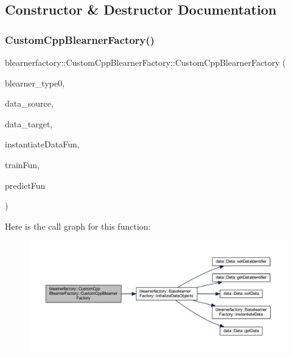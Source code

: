 \subsection{Constructor \& Destructor Documentation}
\mbox{\label{classblearnerfactory_1_1_custom_cpp_blearner_factory_a390de0fb001434b3252e5f723c55d7b3}} 
\subsubsection{\texorpdfstring{Custom\+Cpp\+Blearner\+Factory()}{BaselearnerCustomCppFactory()}}
{\footnotesize\ttfamily blearnerfactory\+::\+Custom\+Cpp\+Blearner\+Factory\+::\+Custom\+Cpp\+Blearner\+Factory (\begin{DoxyParamCaption}\item[{const std\+::string \&}]{blearner\+\_\+type0,  }\item[{\mbox{\hyperlink{classdata_1_1_data}{data\+::\+Data}} $\ast$}]{data\+\_\+source,  }\item[{\mbox{\hyperlink{classdata_1_1_data}{data\+::\+Data}} $\ast$}]{data\+\_\+target,  }\item[{S\+E\+XP}]{instantiate\+Data\+Fun,  }\item[{S\+E\+XP}]{train\+Fun,  }\item[{S\+E\+XP}]{predict\+Fun }\end{DoxyParamCaption})}

Here is the call graph for this function\+:\nopagebreak
\begin{figure}[H]
\begin{center}
\leavevmode
\includegraphics[width=350pt]{classblearnerfactory_1_1_custom_cpp_blearner_factory_a390de0fb001434b3252e5f723c55d7b3_cgraph}
\end{center}
\end{figure}


